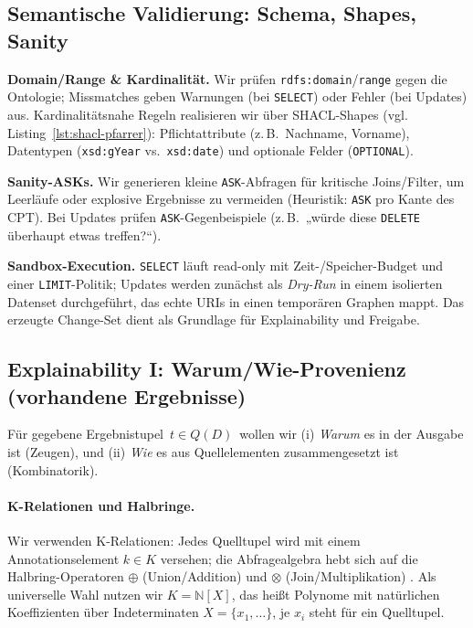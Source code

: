 \subsection{Semantische Validierung: Schema, Shapes, Sanity}
\label{sec:valid-semantik}

\textbf{Domain/Range \& Kardinalität.} Wir prüfen \texttt{rdfs:domain}/\texttt{range} gegen die Ontologie; Missmatches geben Warnungen (bei \texttt{SELECT}) oder Fehler (bei Updates) aus. Kardinalitätsnahe Regeln realisieren wir über SHACL-Shapes (vgl. Listing~\ref{lst:shacl-pfarrer}): Pflichtattribute (z.\,B.\ Nachname, Vorname), Datentypen (\texttt{xsd:gYear} vs.\ \texttt{xsd:date}) und optionale Felder (\texttt{OPTIONAL}).

\textbf{Sanity-ASKs.} Wir generieren kleine \texttt{ASK}-Abfragen für kritische Joins/Filter, um Leerläufe oder explosive Ergebnisse zu vermeiden (Heuristik: \texttt{ASK} pro Kante des CPT). Bei Updates prüfen \texttt{ASK}-Gegenbeispiele (z.\,B.\ „würde diese \texttt{DELETE} überhaupt etwas treffen?“).

\textbf{Sandbox-Execution.} \texttt{SELECT} läuft read-only mit Zeit-/Speicher-Budget und einer \texttt{LIMIT}-Politik; Updates werden zunächst als \emph{Dry-Run} in einem isolierten Datenset durchgeführt, das echte URIs in einen temporären Graphen mappt. Das erzeugte Change-Set dient als Grundlage für Explainability und Freigabe.


\subsection{Explainability I: Warum/Wie-Provenienz (vorhandene Ergebnisse)}
\label{sec:explain-why-how}

Für gegebene Ergebnistupel \(\,t \in Q(D)\,\) wollen wir (i) \emph{Warum} es in der Ausgabe ist (Zeugen), und (ii) \emph{Wie} es aus Quellelementen zusammengesetzt ist (Kombinatorik).

\paragraph{K-Relationen und Halbringe.}
Wir verwenden K-Relationen: Jedes Quelltupel wird mit einem Annotationselement \(k \in K\) versehen; die Abfragealgebra hebt sich auf die Halbring-Operatoren \(\oplus\) (Union/Addition) und \(\otimes\) (Join/Multiplikation) \cite{green2007provenance}. Als universelle Wahl nutzen wir \(K=\mathbb{N}[X]\), das heißt Polynome mit natürlichen Koeffizienten über Indeterminaten \(X=\{x_1,\dots\}\), je \(x_i\) steht für ein Quelltupel.

